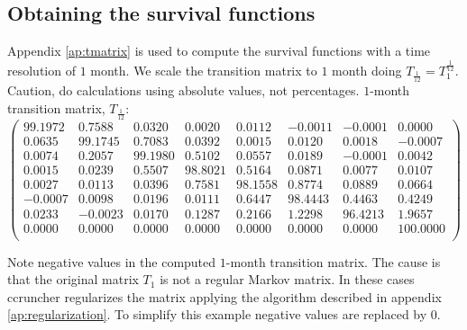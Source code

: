 \documentclass[a4paper,12pt,final]{article}
\begin{document}
\subsection{Obtaining the survival functions}

Appendix \ref{ap:tmatrix} is used to compute the survival functions 
with a time resolution of $1$ month. We scale the transition matrix 
to $1$ month doing $T_{\frac{1}{12}} = T_{1}^{\frac{1}{12}}$. Caution, 
do calculations using absolute values, not percentages. $1$-month 
transition matrix, $T_{\frac{1}{12}}$:
{\small
\begin{displaymath}
\left( 
\begin{array}{cccccccc}
    99.1972  &   0.7588  &   0.0320  &   0.0020  &   0.0112  &  -0.0011  &  -0.0001  &   0.0000  \\
     0.0635  &  99.1745  &   0.7083  &   0.0392  &   0.0015  &   0.0120  &   0.0018  &  -0.0007  \\
     0.0074  &   0.2057  &  99.1980  &   0.5102  &   0.0557  &   0.0189  &  -0.0001  &   0.0042  \\
     0.0015  &   0.0239  &   0.5507  &  98.8021  &   0.5164  &   0.0871  &   0.0077  &   0.0107  \\
     0.0027  &   0.0113  &   0.0396  &   0.7581  &  98.1558  &   0.8774  &   0.0889  &   0.0664  \\
    -0.0007  &   0.0098  &   0.0196  &   0.0111  &   0.6447  &  98.4443  &   0.4463  &   0.4249  \\
     0.0233  &  -0.0023  &   0.0170  &   0.1287  &   0.2166  &   1.2298  &  96.4213  &   1.9657  \\
     0.0000  &   0.0000  &   0.0000  &   0.0000  &   0.0000  &   0.0000  &   0.0000  & 100.0000  \\
\end{array}
\right)
\end{displaymath}
}

Note negative values in the computed $1$-month transition matrix. The cause is that 
the original matrix $T_1$ is not a regular Markov matrix. In these cases ccruncher 
regularizes the matrix applying the algorithm described in appendix \ref{ap:regularization}.
To simplify this example negative values are replaced by $0$.
\newline
\end{document}
